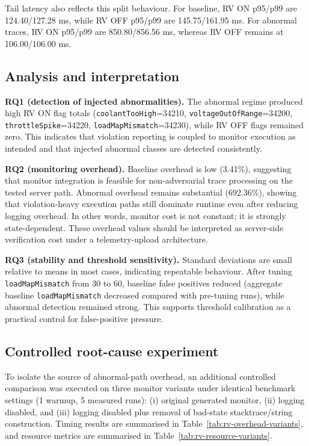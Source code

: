 Tail latency also reflects this split behaviour. For baseline, RV ON p95/p99 are 124.40/127.28 ms, while RV OFF p95/p99 are 145.75/161.95 ms. For abnormal traces, RV ON p95/p99 are 850.80/856.56 ms, whereas RV OFF remains at 106.00/106.00 ms.

\subsection{Analysis and interpretation}

\textbf{RQ1 (detection of injected abnormalities).} The abnormal regime produced high RV ON flag totals (\texttt{coolantTooHigh}=34210, \texttt{voltageOutOfRange}=34200, \texttt{throttleSpike}=34220, \texttt{loadMapMismatch}=34230), while RV OFF flags remained zero. This indicates that violation reporting is coupled to monitor execution as intended and that injected abnormal classes are detected consistently.

\textbf{RQ2 (monitoring overhead).} Baseline overhead is low (3.41\%), suggesting that monitor integration is feasible for non-adversarial trace processing on the tested server path. Abnormal overhead remains substantial (692.36\%), showing that violation-heavy execution paths still dominate runtime even after reducing logging overhead. In other words, monitor cost is not constant; it is strongly state-dependent. These overhead values should be interpreted as server-side verification cost under a telemetry-upload architecture.

\textbf{RQ3 (stability and threshold sensitivity).} Standard deviations are small relative to means in most cases, indicating repeatable behaviour. After tuning \texttt{loadMapMismatch} from 30 to 60, baseline false positives reduced (aggregate baseline \texttt{loadMapMismatch} decreased compared with pre-tuning runs), while abnormal detection remained strong. This supports threshold calibration as a practical control for false-positive pressure.

\subsection{Controlled root-cause experiment}

To isolate the source of abnormal-path overhead, an additional controlled comparison was executed on three monitor variants under identical benchmark settings (1 warmup, 5 measured runs): (i) original generated monitor, (ii) logging disabled, and (iii) logging disabled plus removal of bad-state stacktrace/string construction. Timing results are summarised in Table~\ref{tab:rv-overhead-variants}, and resource metrics are summarised in Table~\ref{tab:rv-resource-variants}.

